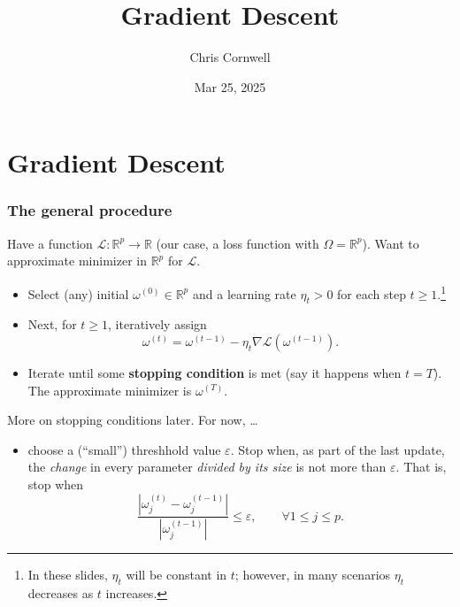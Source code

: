\documentclass{beamer}
\author{Chris Cornwell}
\date{Mar 25, 2025}
\title{Gradient Descent}
\theoremstyle{example}
\begin{document}
\begin{frame}
\titlepage
\end{frame}

\section{Gradient Descent}

\begin{frame}
\frametitle{The general procedure}
    Have a function $\mathcal L:\mathbb R^p \to \mathbb R$ (our case, a loss function with $\Omega=\mathbb R^p$). Want to approximate minimizer in $\mathbb R^p$ for $\mathcal L$. 

    \pause
    \begin{itemize}
        \item Select (any) initial $\omega^{(0)}\in \mathbb R^p$ and a learning rate $\eta_t > 0$ for each step $t\ge 1$.\footnote{In these slides, $\eta_t$ will be constant in $t$; however, in many scenarios $\eta_t$ decreases as $t$ increases.} 
        \pause
        \item Next, for $t\ge 1$, iteratively assign
        \[\omega^{(t)} = \omega^{(t-1)} - \eta_t\nabla\mathcal L(\omega^{(t-1)}).\]
        \pause
        \item Iterate until some \textbf{stopping condition} is met (say it happens when $t = T$). The approximate minimizer is $\omega^{(T)}$.
    \end{itemize}

    \pause
    More on stopping conditions later. For now, \ldots 
    \pause
    \begin{itemize}
        \item choose a (``small'') threshhold value $\varepsilon$. Stop when, as part of the last update, the \emph{change} in every parameter \emph{divided by its size} is not more than $\varepsilon$. \pause That is, stop when 
        {\small
        \[\frac{|\omega^{(t)}_j - \omega^{(t-1)}_j|}{|\omega^{(t-1)}_j|} \le \varepsilon,\qquad \forall 1\le j\le p.\]
        }
    \end{itemize}
\end{frame}
\end{document}
